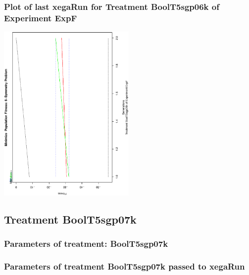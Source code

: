 \documentclass[18pt,c]{beamer}
\makeatletter
\def\beamer@writeslidentry@miniframesoff{%
  \expandafter\beamer@ifempty\expandafter{\beamer@framestartpage}{}%
  {%
   \clearpage\beamer@notesactions%
  }
}
\newcommand*{\miniframesoff}{\let\beamer@writeslidentry=\beamer@writeslidentry@miniframesoff}
\makeatother
\begin{document}
 \begin{frame}
 \frametitle{ Plot of last xegaRun for Treatment BoolT5sgp06k of Experiment ExpF }
 \begin{center}
\includegraphics[width=0.5\textwidth, angle=-90]
{ExpFPlotPopStatsFigure004.eps}
 \end{center}
 \label{report/ExpFPlotPopStatsFigure004.eps}  
 \end{frame}

\miniframesoff
\subsection{Treatment BoolT5sgp07k}

 \begin{frame}
 \fontsize{8pt}{9pt}\selectfont
 \frametitle{  Parameters of treatment: BoolT5sgp07k 
 }

 \label{ExpFtParmTable020.tex}  
 \end{frame}


 \begin{frame}
 \fontsize{8pt}{9pt}\selectfont
 \frametitle{  Parameters of treatment BoolT5sgp07k passed to xegaRun
 }

 \label{ExpFtParmTable021.tex}  
 \end{frame}
\end{document}

